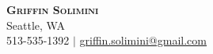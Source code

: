 \documentclass[letterpaper,11pt]{article}
\begin{document}
\begin{center}
{\Huge\scshape\bfseries Griffin Solimini}\\[3pt]
\small Seattle, WA\\[2pt]
513-535-1392 $|$ \href{mailto:griffin.solimini@gmail.com}{\underline{griffin.solimini@gmail.com}}
\end{center}



\end{document}
